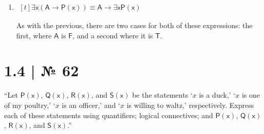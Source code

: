 \documentclass[
   paper=a4,
   fontsize=11pt,
   parskip=no,       %
   fleqn             %
]{scrartcl}
\newcommand{\BT}{$\bm{\mathsf{T}}$}
\newcommand{\BF}{$\bm{\mathsf{F}}$}
\renewcommand{\qed}{\hfill\blacksquare}
\newcommand{\Pm}[1]{\ensuremath{\mathsf{#1}}}
\newcommand{\Pv}[1]{\ensuremath{\mathit{#1}}}
\begin{document}
\begin{multicols}{2}
\begin{enumerate}[
      leftmargin=0pt, labelsep=0.25em,
      label=\textsf{\textbf{\alph*)}}
]
   As we have shown the two expressions to be equivalent in every case, we can conclude them to be
   logically equivalent. \qed

\columnbreak

   \item\hfil$\begin{aligned}[t]
      \Pm{\exists x (A \rightarrow P(x)) \equiv A \rightarrow \exists x P(x)}
   \end{aligned}$

   As with the previous, there are two cases for both of these expressions: the first, where \Pm{A}
   is \BF, and a second where it is \BT.

\end{enumerate}
\end{multicols}

\section*{1.4 | № 62}
\begin{addmargin}[2.5em]{2.5em}{\sffamily
   “Let \Pm{P(x)}, \Pm{Q(x)}, \Pm{R(x)}, and \Pm{S(x)} be the statements ‘\Pv{x} is a duck,’ ‘\Pv{x}
   is one of my poultry,’ ‘\Pv{x} is an officer,’ and ‘\Pv{x} is willing to waltz,’ respectively.
   Express each of these statements using quantifiers; logical connectives; and \Pm{P(x)},
   \Pm{Q(x)}, \Pm{R(x)}, and \Pm{S(x)}.”
}\end{addmargin}
\end{document}
